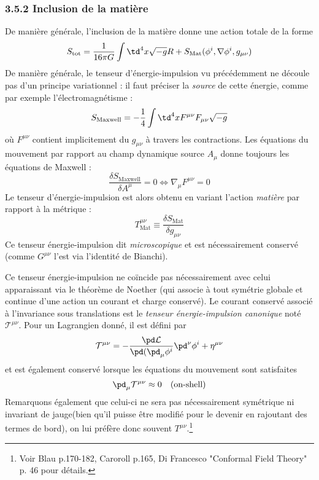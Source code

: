 \subsubsection{3.5.2 Inclusion de la matière}
De manière générale, l'inclusion de la matière donne une action totale de la forme
\begin{equation}
    S_{\text{tot}} = \frac{1}{16\pi G} \int \td ^4x \sqrt{-g}R + S_{\text{Mat}}(\phi^i , \nabla \phi^i, g_{\mu \nu})
\end{equation}
De manière générale, le tenseur d'énergie-impulsion vu précédemment ne découle pas d'un principe variationnel : il faut préciser la \emph{source} de cette énergie, comme par exemple l'électromagnétisme :
\begin{equation}
    S_{\text{Maxwell}} = -\frac{1}{4} \int \td ^4x  F^{\mu \nu}F_{\mu\nu}\sqrt{-g}
\end{equation}
où $F^{\mu \nu}$ contient implicitement du $g_{\mu \nu}$ à travers les contractions. Les équations du mouvement par rapport au champ dynamique source $A_\mu$ donne toujours les équations de Maxwell :
\begin{equation}
    \frac{\delta S_{\text{Maxwell}}}{\delta A^{\mu}} = 0 \iff \nabla_{\mu} F^{\mu \nu} = 0
\end{equation}
Le tenseur d'énergie-impulsion est alors obtenu en variant l'action \emph{matière} par rapport à la métrique :
\begin{equation}
    T^{\mu\nu}_\text{Mat} \equiv \frac{\delta S_\text{Mat}}{\delta g_{\mu\nu}}
\end{equation}
Ce tenseur énergie-impulsion dit \emph{microscopique} et est nécessairement conservé (comme $G^{\mu\nu}$ l'est via l'identité de Bianchi).
\begin{rmk}
    Ce tenseur énergie-impulsion ne coïncide pas nécessairement avec celui apparaissant via le théorème de Noether (qui associe à tout symétrie globale et continue d'une action un courant et charge conservé). Le courant conservé associé à l'invariance sous translations est le \emph{tenseur énergie-impulsion canonique} noté $\mathcal{T}^{\mu\nu}$. Pour un Lagrangien donné, il est défini par
    \begin{equation}
        \mathcal{T}^{\mu\nu} = - \frac{\pd \mathcal{L}}{\pd (\pd_\mu \phi^i} \pd^\nu \phi^i + \eta^{\mu\nu}
    \end{equation}
    et est également conservé lorsque les équations du mouvement sont satisfaites
    \begin{equation}
        \pd_\mu \mathcal{T}^{\mu\nu} \approx 0 \quad \text{(on-shell)}
    \end{equation}
    Remarquons également que celui-ci ne sera pas nécessairement symétrique ni invariant de jauge(bien qu'il puisse être modifié pour le devenir en rajoutant des termes de bord), on lui préfère donc souvent $T^{\mu\nu}$.\footnote{Voir Blau p.170-182, Caroroll p.165, Di Francesco "Conformal Field Theory" p. 46 pour détails.}
\end{rmk}
